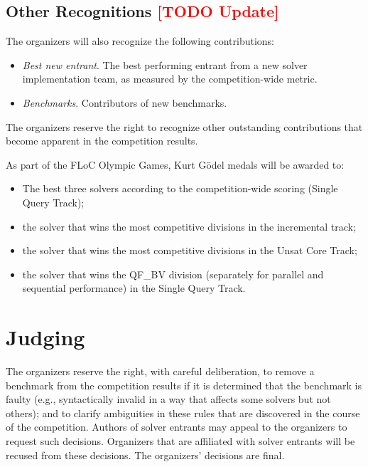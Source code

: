 \documentclass[12pt]{article}
\newcommand{\rem}[1]{\textcolor{red}{[#1]}}
\newcommand{\todo}[1]{\rem{TODO #1}}
\newcommand{\main}{Single Query\xspace}
\newcommand{\ucore}{Unsat Core\xspace}
\begin{document}
\subsection{Other Recognitions \todo{Update}}

The organizers will also recognize the following contributions:
%
\begin{itemize}
\item \emph{Best new entrant}. The best performing entrant from a new
  solver implementation team, as measured by the competition-wide
  metric.
\item \emph{Benchmarks}. Contributors of new benchmarks.
\end{itemize}
%
The organizers reserve the right to recognize other outstanding
contributions that become apparent in the competition results.

As part of the FLoC Olympic Games, Kurt G{\"o}del medals will be
awarded to:
%
\begin{itemize}
\item The best three solvers according to the competition-wide scoring
  (\main Track);
\item the solver that wins the most competitive divisions in the
  incremental track;
\item the solver that wins the most competitive divisions in the
  \ucore Track;
\item the solver that wins the QF\_BV division (separately for
  parallel and sequential performance) in the \main Track.
\end{itemize}


\section{Judging}

The organizers reserve the right, with careful deliberation, to remove
a benchmark from the competition results if it is determined that the
benchmark is faulty (e.g., syntactically invalid in a way that affects
some solvers but not others); and to clarify ambiguities in these
rules that are discovered in the course of the competition.  Authors
of solver entrants may appeal to the organizers to request such
decisions.  Organizers that are affiliated with solver entrants will
be recused from these decisions.  The organizers' decisions are final.

\end{document}
